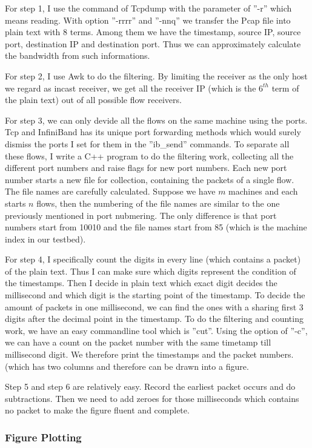 \documentclass[12pt,a4paper]{article}
\begin{document}
For step 1, I use the command of Tcpdump with the parameter of ''-r'' which means reading.
With option ''-rrrr'' and ''-nnq'' we transfer the Pcap file into plain text with 8 terms.
Among them we have the timestamp, source IP, source port, destination IP and destination port.
Thus we can approximately calculate the bandwidth from such informations.

For step 2, I use Awk to do the filtering. By limiting the receiver as the only host we regard as incast receiver, we get all the receiver IP (which is the
$6^{th}$ term of the plain text) out of all possible flow receivers.

For step 3, we can only devide all the flows on the same machine using the ports.
Tcp and InfiniBand has its unique port forwarding methods which would surely dismiss the ports I set for them in the ''ib\_send'' commands.
To separate all these flows, I write a C++ program to do the filtering work, collecting all the different port numbers and raise flags for new port numbers.
Each new port number starts a new file for collection, containing the packets of a single flow.
The file names are carefully calculated.
Suppose we have $m$ machines and each starts $n$ flows, then the numbering of the file names are similar to the one previously mentioned in port nubmering.
The only difference is that port numbers start from 10010 and the file names start from 85 (which is the machine index in our testbed).

For step 4, I specifically count the digits in every line (which contains a packet) of the plain text. Thus I can make sure which digits represent the condition
of the timestamps. 
Then I decide in plain text which exact digit decides the millisecond and which digit is the starting point of the timestamp.
To decide the amount of packets in one millisecond, we can find the ones with a sharing first 3 digits after the decimal point in the timestamp.
To do the filtering and counting work, we have an easy commandline tool which is ''cut''.
Using the option of ''-c'', we can have a count on the packet number with the same timetamp till millisecond digit.
We therefore print the timestamps and the packet numbers. (which has two columns and therefore can be drawn into a figure.

Step 5 and step 6 are relatively easy. 
Record the earliest packet occurs and do subtractions.
Then we need to add zeroes for those milliseconds which contains no packet to make the figure fluent and complete.

\subsubsection{Figure Plotting}
\end{document}
